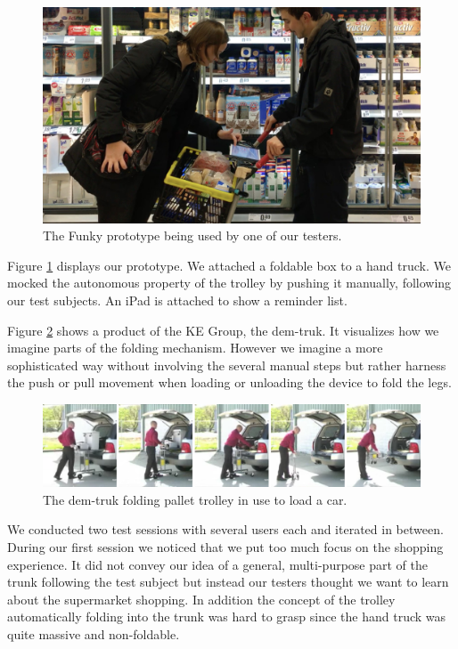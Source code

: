 \begin{figure}[ht]
\centering
	\includegraphics[keepaspectratio, width=\textwidth]{Figures/Prototypes/Funky/shopping_cart}
	\caption{The Funky prototype being used by one of our testers.}
	\label{fig:shopping_cart}
\end{figure}

Figure \ref{fig:shopping_cart} displays our prototype. We attached a foldable box to a hand truck. We mocked the autonomous property of the trolley by pushing it manually, following our test subjects. An iPad is attached to show a reminder list.

Figure \ref{fig:demtruk} shows a product of the KE Group, the dem-truk. It visualizes how we imagine parts of the folding mechanism. However we imagine a more sophisticated way without involving the several manual steps but rather harness the push or pull movement when loading or unloading the device to fold the legs.

\begin{figure}[ht]
\centering
	\includegraphics[keepaspectratio, width=\textwidth]{Figures/Prototypes/Funky/demtruk}
	\caption[The dem-truk trolley.]{The dem-truk folding pallet trolley in use to load a car.\protect\footnotemark}
	\label{fig:demtruk}
\end{figure}


We conducted two test sessions with several users each and iterated in between. During our first session we noticed that we put too much focus on the shopping experience. It did not convey our idea of a general, multi-purpose part of the trunk following the test subject but instead our testers thought we want to learn about the supermarket shopping. In addition the concept of the trolley automatically folding into the trunk was hard to grasp since the hand truck was quite massive and non-foldable.

